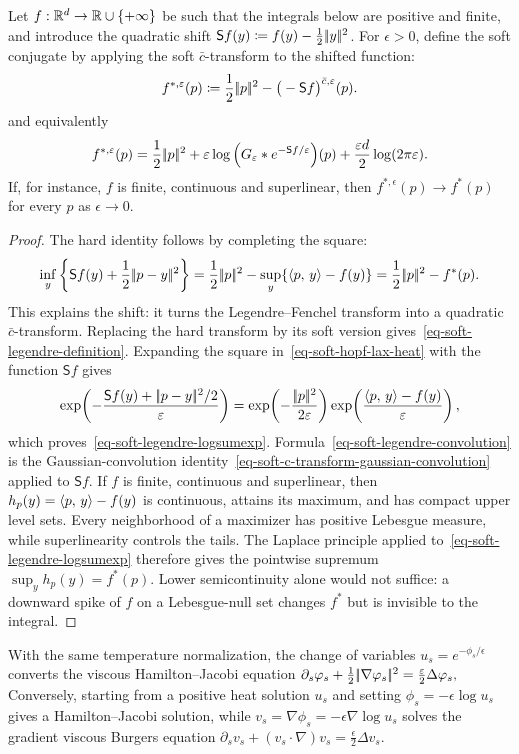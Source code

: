 \begin{prop}\label{prop-soft-legendre-convolution}
Let $f:\mathbb{R}^d\to\mathbb{R}\cup\{+\infty\}$ be such that the integrals below are positive and finite, and introduce the quadratic shift $\mathsf S f(y)\coloneqq f(y)-\frac12|\!| y |\!|^2$.
For $\epsilon>0$, define the soft conjugate by applying the soft $\bar c$-transform to the shifted function:
\begin{equation}\label{eq-soft-legendre-definition}
f^{*,\varepsilon}(p)
\coloneqq
\frac12|\!| p |\!|^2-\big(-\mathsf S f\big)^{\bar c,\varepsilon}(p).
\end{equation}
and equivalently
\begin{equation}\label{eq-soft-legendre-convolution}
f^{*,\varepsilon}(p)
=
\frac12|\!| p |\!|^2
+\varepsilon\log\Big(G_\varepsilon\ast e^{-\mathsf S f/\varepsilon}\Big)(p)
+\frac{\varepsilon d}{2}\log(2\pi\varepsilon).
\end{equation}
If, for instance, $f$ is finite, continuous and superlinear, then $f^{*,\epsilon}(p)\to f^*(p)$ for every $p$ as $\epsilon\to0$.
\end{prop}
\begin{proof}
The hard identity follows by completing the square:
\[
\inf_y\left\{\mathsf S f(y)+\frac12|\!| p-y |\!|^2\right\}
=
\frac12|\!| p |\!|^2-
\sup_y\{\langle p,\,y\rangle-f(y)\}
=
\frac12|\!| p |\!|^2-f^*(p).
\]
This explains the shift: it turns the Legendre--Fenchel transform into a quadratic $\bar c$-transform. Replacing the hard transform by its soft version gives~\eqref{eq-soft-legendre-definition}. Expanding the square in~\eqref{eq-soft-hopf-lax-heat} with the function $\mathsf S f$ gives
\[
\exp\!\left(-\frac{\mathsf S f(y)+|\!| p-y |\!|^2/2}{\varepsilon}\right)
=
\exp\!\left(-\frac{|\!| p |\!|^2}{2\varepsilon}\right)
\exp\!\left(\frac{\langle p,\,y\rangle-f(y)}{\varepsilon}\right),
\]
which proves~\eqref{eq-soft-legendre-logsumexp}. Formula~\eqref{eq-soft-legendre-convolution} is the Gaussian-convolution identity~\eqref{eq-soft-c-transform-gaussian-convolution} applied to $\mathsf S f$. If $f$ is finite, continuous and superlinear, then $h_p(y)=\langle p,\,y\rangle-f(y)$ is continuous, attains its maximum, and has compact upper level sets. Every neighborhood of a maximizer has positive Lebesgue measure, while superlinearity controls the tails. The Laplace principle applied to~\eqref{eq-soft-legendre-logsumexp} therefore gives the pointwise supremum $\sup_y h_p(y)=f^*(p)$. Lower semicontinuity alone would not suffice: a downward spike of $f$ on a Lebesgue-null set changes $f^*$ but is invisible to the integral.
\end{proof}
With the same temperature normalization, the change of variables $u_s=e^{-\phi_s/\epsilon}$ converts the viscous Hamilton--Jacobi equation
\(\partial_s\varphi_s+\frac12|\!| \nabla\varphi_s |\!|^2=\frac{\varepsilon}{2}\Delta\varphi_s,\)
Conversely, starting from a positive heat solution $u_s$ and setting $\phi_s=-\epsilon\log u_s$ gives a Hamilton--Jacobi solution, while $v_s=\nabla\phi_s=-\epsilon\nabla\log u_s$ solves the gradient viscous Burgers equation
\(\partial_s v_s+(v_s\cdot\nabla)v_s=\frac{\epsilon}{2}\Delta v_s.\)
